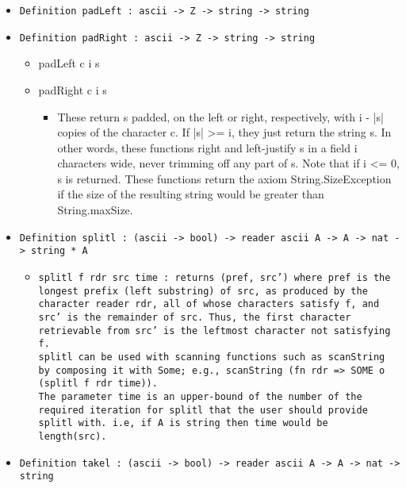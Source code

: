 \documentclass[11pt]{report}
\begin{document}
\begin{itemize}
\item \texttt{Definition padLeft : ascii -> Z -> string -> string}

\item  \texttt{Definition padRight : ascii -> Z -> string -> string}

\begin{itemize}
\item   padLeft c i s 
\item padRight c i s 
\begin{itemize}
\item These return s padded, on the left or right, respectively, with i - |s| copies of the character c. If |s| >= i, they just return the string s. In other words, these functions right and left-justify s in a field i characters wide, never trimming off any part of s. Note that if i <= 0, s is returned. These functions return the axiom String.SizeException if the size of the resulting string would be greater than String.maxSize.
\end{itemize}

\end{itemize}

\item  \texttt{Definition splitl : (ascii -> bool) -> reader ascii A -> A -> nat -> string * A}

\begin{itemize}
\item  \begin{flushleft} \texttt{splitl f rdr src time : returns (pref, src') where pref is the longest prefix (left substring) of src, as produced by the character reader rdr, all of whose characters satisfy f, and src' is the remainder of src. Thus, the first character retrievable from src' is the leftmost character not satisfying f.\\
\coqdocemptyline
splitl can be used with scanning functions such as scanString by composing it with Some; e.g., scanString (fn rdr => SOME o (splitl f rdr time)).\\
\coqdocemptyline
The parameter time is an upper-bound of the number of the required iteration for splitl that the user should provide splitl with. i.e, if A is string then time would be length(src).} \end{flushleft}



\end{itemize}

\item  \texttt{Definition takel : (ascii -> bool) -> reader ascii A -> A -> nat -> string}


\end{itemize}
\end{document}

